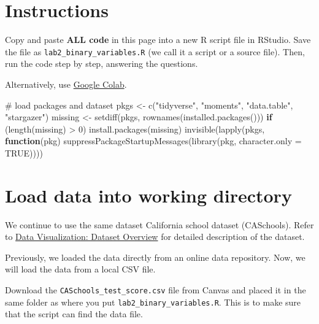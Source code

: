 \documentclass[
  12pt,
  letterpaper,
]{scrbook}
\newenvironment{Shaded}{\begin{snugshade}}{\end{snugshade}}
\newcommand{\AttributeTok}[1]{\textcolor[rgb]{0.40,0.45,0.13}{#1}}
\newcommand{\CommentTok}[1]{\textcolor[rgb]{0.37,0.37,0.37}{#1}}
\newcommand{\ConstantTok}[1]{\textcolor[rgb]{0.56,0.35,0.01}{#1}}
\newcommand{\ControlFlowTok}[1]{\textcolor[rgb]{0.00,0.23,0.31}{\textbf{#1}}}
\newcommand{\DecValTok}[1]{\textcolor[rgb]{0.68,0.00,0.00}{#1}}
\newcommand{\FunctionTok}[1]{\textcolor[rgb]{0.28,0.35,0.67}{#1}}
\newcommand{\NormalTok}[1]{\textcolor[rgb]{0.00,0.23,0.31}{#1}}
\newcommand{\OtherTok}[1]{\textcolor[rgb]{0.00,0.23,0.31}{#1}}
\newcommand{\SpecialCharTok}[1]{\textcolor[rgb]{0.37,0.37,0.37}{#1}}
\newcommand{\StringTok}[1]{\textcolor[rgb]{0.13,0.47,0.30}{#1}}
\theoremstyle{plain}
\theoremstyle{definition}
\theoremstyle{remark}
\begin{document}
\section{Instructions}\label{instructions-1}

Copy and paste \textbf{ALL code} in this page into a new R script file
in RStudio. Save the file as \texttt{lab2\_binary\_variables.R} (we call
it a script or a source file). Then, run the code step by step,
answering the questions.

Alternatively, use
\href{https://colab.research.google.com/drive/1EcWkJfhHJOhDEHXaZgu3_f66pnlEum5R?usp=share_link}{Google
Colab}.

\begin{Shaded}
\begin{Highlighting}[]
\CommentTok{\# load packages and dataset}
\NormalTok{pkgs }\OtherTok{\textless{}{-}} \FunctionTok{c}\NormalTok{(}\StringTok{"tidyverse"}\NormalTok{, }\StringTok{"moments"}\NormalTok{, }\StringTok{"data.table"}\NormalTok{, }\StringTok{"stargazer"}\NormalTok{)}
\NormalTok{missing }\OtherTok{\textless{}{-}} \FunctionTok{setdiff}\NormalTok{(pkgs, }\FunctionTok{rownames}\NormalTok{(}\FunctionTok{installed.packages}\NormalTok{()))}
\ControlFlowTok{if}\NormalTok{ (}\FunctionTok{length}\NormalTok{(missing) }\SpecialCharTok{\textgreater{}} \DecValTok{0}\NormalTok{) }\FunctionTok{install.packages}\NormalTok{(missing)}
\FunctionTok{invisible}\NormalTok{(}\FunctionTok{lapply}\NormalTok{(pkgs, }\ControlFlowTok{function}\NormalTok{(pkg) }\FunctionTok{suppressPackageStartupMessages}\NormalTok{(}\FunctionTok{library}\NormalTok{(pkg, }\AttributeTok{character.only =} \ConstantTok{TRUE}\NormalTok{))))}
\end{Highlighting}
\end{Shaded}

\section{Load data into working
directory}\label{load-data-into-working-directory}

We continue to use the same dataset California school dataset
(CASchools). Refer to \hyperref[dataset-overview]{Data Visualization:
Dataset Overview} for detailed description of the dataset.

Previously, we loaded the data directly from an online data repository.
Now, we will load the data from a local CSV file.

Download the \texttt{CASchools\_test\_score.csv} file from Canvas and
placed it in the same folder as where you put
\texttt{lab2\_binary\_variables.R}. This is to make sure that the script
can find the data file.
\end{document}
